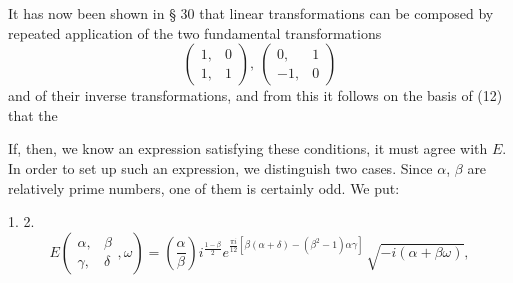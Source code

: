 It has now been shown in § 30 that  linear transformations can be composed by repeated application of the two fundamental transformations
\[
\begin{pmatrix}1, & 0\\ 1, & 1\end{pmatrix}, \ \begin{pmatrix}0, & 1\\ -1, & 0\end{pmatrix}
\]
and of their inverse transformations, and from this it follows on the basis of (12) that the 

If, then, we know an expression satisfying these conditions, it must agree with $E$. In order to set up such an expression, we distinguish two cases. Since $\alpha$, $\beta$ are relatively prime numbers, one of them is certainly odd. We put:

1. 
2. 
\[
E\left(\begin{smallmatrix}\alpha, & \beta\\ \gamma, & \delta\end{smallmatrix}, \omega\right) = \left(\frac{\alpha}{\beta}\right) i^{\frac{1-\beta}{2}} e^{\frac{\pi i}{12}[\beta(\alpha+\delta)-(\beta^2-1)\alpha\gamma]}\,\sqrt{-i(\alpha+\beta\omega)},
\]
